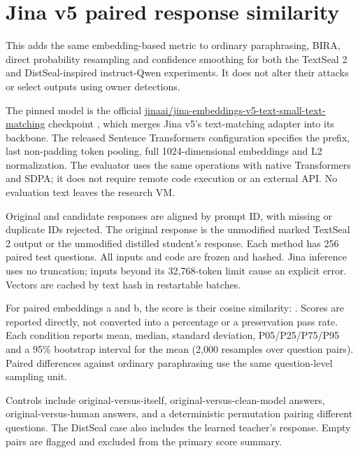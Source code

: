 \section{Jina v5 paired response
similarity}\label{record-docs-jina-similarity-md-jina-v5-paired-response-similarity}

This adds the same embedding-based metric to ordinary paraphrasing,
BIRA, direct probability resampling and confidence smoothing for both
the TextSeal 2 and DistSeal-inspired instruct-Qwen experiments. It does
not alter their attacks or select outputs using owner detections.

The pinned model is the official
\href{https://huggingface.co/jinaai/jina-embeddings-v5-text-small-text-matching}{jinaai/jina-embeddings-v5-text-small-text-matching}
checkpoint \texttt{},
which merges Jina v5's text-matching adapter into its backbone. The
released Sentence Transformers configuration specifies the
\texttt{} prefix, last non-padding token pooling,
full 1024-dimensional embeddings and L2 normalization. The evaluator
uses the same operations with native Transformers and SDPA; it does not
require remote code execution or an external API. No evaluation text
leaves the research VM.

Original and candidate responses are aligned by prompt ID, with missing
or duplicate IDs rejected. The original response is the unmodified
marked TextSeal 2 output or the unmodified distilled student's response.
Each method has 256 paired test questions. All inputs and code are
frozen and hashed. Jina inference uses no truncation; inputs beyond its
32,768-token limit cause an explicit error. Vectors are cached by text
hash in restartable batches.

For paired embeddings a and b, the score is their cosine similarity:
\texttt{}. Scores are reported
directly, not converted into a percentage or a preservation pass rate.
Each condition reports mean, median, standard deviation, P05/P25/P75/P95
and a 95\% bootstrap interval for the mean (2,000 resamples over
question pairs). Paired differences against ordinary paraphrasing use
the same question-level sampling unit.

Controls include original-versus-itself, original-versus-clean-model
answers, original-versus-human answers, and a deterministic permutation
pairing different questions. The DistSeal case also includes the learned
teacher's response. Empty pairs are flagged and excluded from the
primary score summary.

